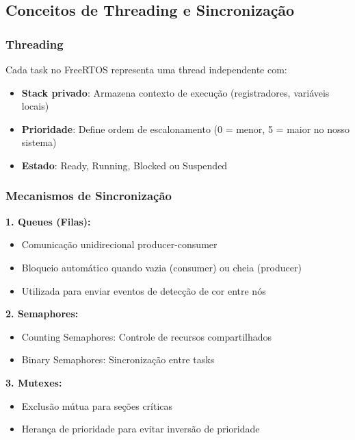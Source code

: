 \documentclass[12pt,a4paper]{article}
\begin{document}
\subsection{Conceitos de Threading e Sincronização}

\subsubsection{Threading}

Cada task no FreeRTOS representa uma thread independente com:

\begin{itemize}
    \item \textbf{Stack privado}: Armazena contexto de execução (registradores, variáveis locais)
    \item \textbf{Prioridade}: Define ordem de escalonamento (0 = menor, 5 = maior no nosso sistema)
    \item \textbf{Estado}: Ready, Running, Blocked ou Suspended
\end{itemize}

\subsubsection{Mecanismos de Sincronização}

\textbf{1. Queues (Filas):}
\begin{itemize}
    \item Comunicação unidirecional producer-consumer
    \item Bloqueio automático quando vazia (consumer) ou cheia (producer)
    \item Utilizada para enviar eventos de detecção de cor entre nós
\end{itemize}

\textbf{2. Semaphores:}
\begin{itemize}
    \item Counting Semaphores: Controle de recursos compartilhados
    \item Binary Semaphores: Sincronização entre tasks
\end{itemize}

\textbf{3. Mutexes:}
\begin{itemize}
    \item Exclusão mútua para seções críticas
    \item Herança de prioridade para evitar inversão de prioridade
\end{itemize}
\end{document}
